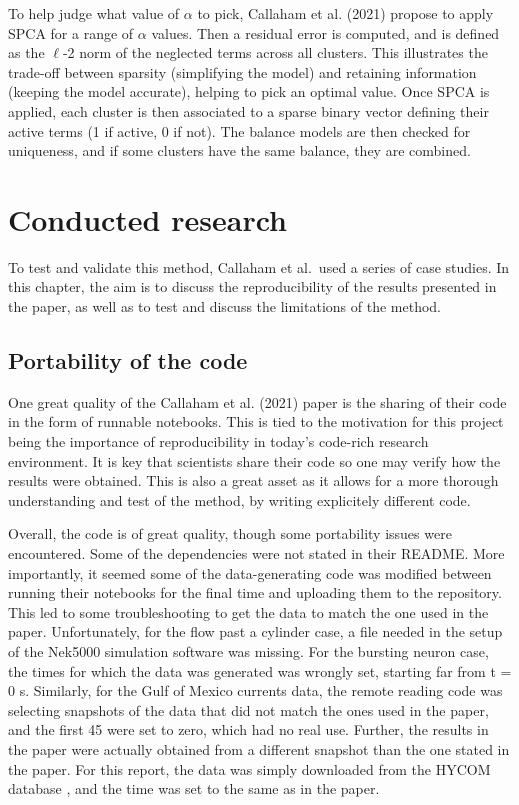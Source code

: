 \documentclass[12pt]{report} %
\begin{document}
To help judge what value of $\alpha$ to pick, Callaham et al. (2021) propose to apply SPCA for a range of $\alpha$ values. Then a residual error is computed, and is defined as the $\ell$-2 norm of the neglected terms across all clusters. This illustrates the trade-off between sparsity (simplifying the model) and retaining information (keeping the model accurate), helping to pick an optimal value. Once SPCA is applied, each cluster is then associated to a sparse binary vector defining their active terms (1 if active, 0 if not). The balance models are then checked for uniqueness, and if some clusters have the same balance, they are combined.


\chapter{Conducted research}

To test and validate this method, Callaham et al.\ used a series of case studies\cite{callaham2021learning}. In this chapter, the aim is to discuss the reproducibility of the results presented in the paper, as well as to test and discuss the limitations of the method.

\section{Portability of the code}

One great quality of the Callaham et al. (2021)\cite{callaham2021learning} paper is the sharing of their code in the form of runnable notebooks. This is tied to the motivation for this project being the importance of reproducibility in today’s code-rich research environment. It is key that scientists share their code so one may verify how the results were obtained. This is also a great asset as it allows for a more thorough understanding and test of the method, by writing explicitely different code.

\vspace{5mm}

Overall, the code is of great quality, though some portability issues were encountered. Some of the dependencies were not stated in their README. More importantly, it seemed some of the data-generating code was modified between running their notebooks for the final time and uploading them to the repository. This led to some troubleshooting to get the data to match the one used in the paper. Unfortunately, for the flow past a cylinder case, a file needed in the setup of the Nek5000 simulation software was missing\cite{nek5000setup}. For the bursting neuron case, the times for which the data was generated was wrongly set, starting far from t = 0 s. Similarly, for the Gulf of Mexico currents data, the remote reading code was selecting snapshots of the data that did not match the ones used in the paper, and the first 45 were set to zero, which had no real use. Further, the results in the paper were actually obtained from a different snapshot than the one stated in the paper. For this report, the data was simply downloaded from the HYCOM database \cite{hycom}, and the time was set to the same as in the paper.
\end{document}
